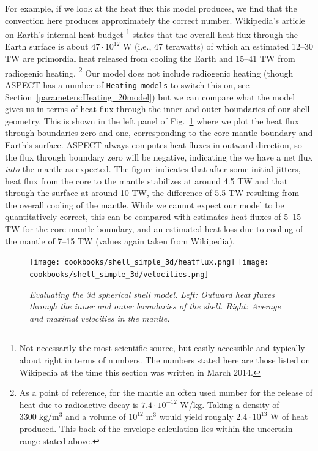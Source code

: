 \documentclass{article}
\newcommand{\aspect}{\textsc{ASPECT}}
\begin{document}
For example, if we look at the heat flux this model produces, we find that the
convection here produces approximately the correct number. Wikipedia's article
on \href{http://en.wikipedia.org/wiki/Earth's_internal_heat_budget}{Earth's
internal heat budget}%
\footnote{Not necessarily the most scientific source, but easily
accessible and typically about right in terms of numbers. The numbers stated
here are those listed on Wikipedia at the time this section was written in
March 2014.}
states that the overall heat flux through the Earth surface is about $47 \cdot
10^{12}$ W (i.e., 47 terawatts) of which an estimated 12--30 TW are primordial
heat released from cooling the Earth and 15--41 TW from radiogenic heating.%
\footnote{As a point of reference, for the mantle an often used number for the
release of heat due to radioactive decay is $7.4\cdot 10^{-12}$ W/kg. Taking a
density of $3300\; \text{kg}/\text{m}^3$ and a volume of $10^{12}\; \text{m}^3$
would yield roughly $2.4\cdot 10^{13}$ W of heat produced. This back of the
envelope calculation lies within the uncertain range stated above.}
Our model does not include radiogenic heating (though \aspect{} has a number of 
\texttt{Heating models} to switch this on, see 
Section~\ref{parameters:Heating_20model}) but we can compare what the model
gives us in terms of heat flux through the inner and outer boundaries of our
shell geometry. This is shown in the left panel of
Fig.~\ref{fig:shell-simple-3d-eval} where we plot the heat flux through
boundaries zero and one, corresponding to the core-mantle boundary and Earth's
surface. \aspect{} always computes heat fluxes in outward direction, so the flux
through boundary zero will be negative, indicating the we have a net flux
\textit{into} the mantle as expected. The figure indicates that after some
initial jitters, heat flux from the core to the mantle stabilizes at around 4.5
TW and that through the surface at around 10 TW, the difference of 5.5 TW
resulting from the overall cooling of the mantle. While we cannot expect our model to be
quantitatively correct, this can be compared with estimates heat fluxes of 5--15
TW for the core-mantle boundary, and an estimated heat loss due to cooling of
the mantle of 7--15 TW (values again taken from Wikipedia).

\begin{figure}
  \texttt{[image: cookbooks/shell\_simple\_3d/heatflux.png]}
  \hfill
  \texttt{[image: cookbooks/shell\_simple\_3d/velocities.png]}
  \caption{\it Evaluating the 3d spherical shell model. Left: Outward heat
  fluxes through the inner and outer boundaries of the shell. Right: Average
  and maximal velocities in the mantle.}
  \label{fig:shell-simple-3d-eval}
\end{figure}
\end{document}
